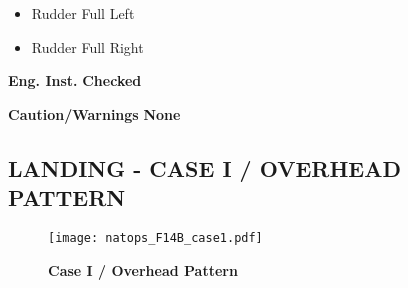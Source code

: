 \documentclass[fontMetropolis]{TechCheck}
\begin{document}
\begin{tablenumerate}
{\begin{subenumerate}
\begin{itemize}
				\item Rudder Full Left
				\item Rudder Full Right
			\end{itemize}
			\item \textbf{Eng. Inst.} \dotfill \textbf{Checked}
			\item \textbf{Caution/Warnings}  \dotfill\textbf{None}
		\end{subenumerate}}
	\end{tablenumerate}

	\clearpage

	\subsection{LANDING -  CASE I / OVERHEAD PATTERN}
	\begin{figure}[h]
		\centering
		\texttt{[image: natops\_F14B\_case1.pdf]}
		\caption{\textbf{Case I / Overhead Pattern}}
		\label{fig:case1}
	\end{figure}
\end{document}
